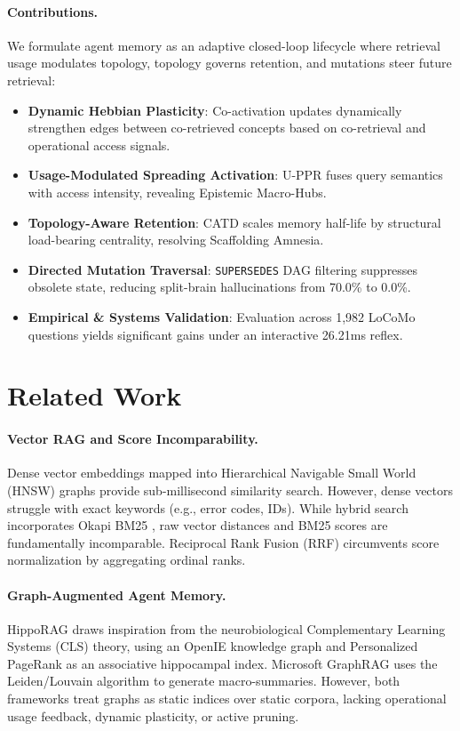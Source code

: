 \documentclass[conference]{IEEEtran}
\begin{document}
\paragraph{Contributions.} We formulate agent memory as an adaptive closed-loop lifecycle where retrieval usage modulates topology, topology governs retention, and mutations steer future retrieval:
\begin{itemize}
    \item \textbf{Dynamic Hebbian Plasticity}: Co-activation updates dynamically strengthen edges between co-retrieved concepts based on co-retrieval and operational access signals.
    \item \textbf{Usage-Modulated Spreading Activation}: U-PPR fuses query semantics with access intensity, revealing Epistemic Macro-Hubs.
    \item \textbf{Topology-Aware Retention}: CATD scales memory half-life by structural load-bearing centrality, resolving Scaffolding Amnesia.
    \item \textbf{Directed Mutation Traversal}: \texttt{SUPERSEDES} DAG filtering suppresses obsolete state, reducing split-brain hallucinations from 70.0\% to 0.0\%.
    \item \textbf{Empirical \& Systems Validation}: Evaluation across 1,982 LoCoMo questions yields significant gains under an interactive 26.21ms reflex.
\end{itemize}

\section{Related Work}

\paragraph{Vector RAG and Score Incomparability.} Dense vector embeddings mapped into Hierarchical Navigable Small World (HNSW) graphs \cite{malkov2018hnsw} provide sub-millisecond similarity search. However, dense vectors struggle with exact keywords (e.g., error codes, IDs). While hybrid search incorporates Okapi BM25 \cite{robertson2009bm25}, raw vector distances and BM25 scores are fundamentally incomparable. Reciprocal Rank Fusion (RRF) \cite{cormack2009rrf} circumvents score normalization by aggregating ordinal ranks.

\paragraph{Graph-Augmented Agent Memory.} HippoRAG \cite{gutierrez2024hipporag} draws inspiration from the neurobiological Complementary Learning Systems (CLS) theory, using an OpenIE knowledge graph and Personalized PageRank \cite{page1999pagerank} as an associative hippocampal index. Microsoft GraphRAG \cite{edge2024graphrag} uses the Leiden/Louvain algorithm \cite{blondel2008louvain} to generate macro-summaries. However, both frameworks treat graphs as static indices over static corpora, lacking operational usage feedback, dynamic plasticity, or active pruning.
\end{document}
